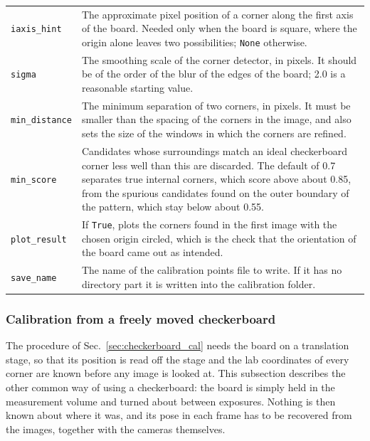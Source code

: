 \documentclass[10pt,a4paper]{article}
\begin{document}
\begin{table}
\begin{tabular}{l m{10cm}}
		\texttt{iaxis\_hint} & The approximate pixel position of a corner along the first axis of the board. Needed only when the board is square, where the origin alone leaves two possibilities; \texttt{None} otherwise. \\[.2cm]

		\texttt{sigma} & The smoothing scale of the corner detector, in pixels. It should be of the order of the blur of the edges of the board; 2.0 is a reasonable starting value. \\[.2cm]

		\texttt{min\_distance} & The minimum separation of two corners, in pixels. It must be smaller than the spacing of the corners in the image, and also sets the size of the windows in which the corners are refined. \\[.2cm]

		\texttt{min\_score} & Candidates whose surroundings match an ideal checkerboard corner less well than this are discarded. The default of 0.7 separates true internal corners, which score above about 0.85, from the spurious candidates found on the outer boundary of the pattern, which stay below about 0.55. \\[.2cm]

		\texttt{plot\_result} & If \texttt{True}, plots the corners found in the first image with the chosen origin circled, which is the check that the orientation of the board came out as intended. \\[.2cm]

		\texttt{save\_name} & The name of the calibration points file to write. If it has no directory part it is written into the calibration folder. \\[.2cm]

		\hline
	\end{tabular}
\end{table}




\subsubsection{Calibration from a freely moved checkerboard}\label{sec:moving_board_cal}

The procedure of Sec.~\ref{sec:checkerboard_cal} needs the board on a translation stage, so that its position is read off the stage and the lab coordinates of every corner are known before any image is looked at. This subsection describes the other common way of using a checkerboard: the board is simply held in the measurement volume and turned about between exposures. Nothing is then known about where it was, and its pose in each frame has to be recovered from the images, together with the cameras themselves.
\end{document}
